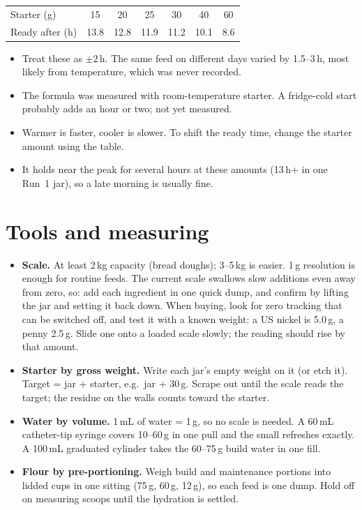 \documentclass[11pt]{article}
\newcommand{\plS}{30}\newcommand{\plF}{75}\newcommand{\plW}{75}
\begin{document}
\begin{center}
\begin{tabular}{@{}lcccccc@{}}
\toprule
Starter (g)        & 15 & 20 & 25 & 30 & 40 & 60 \\
Ready after (h)    & 13.8 & 12.8 & 11.9 & 11.2 & 10.1 & 8.6 \\
\bottomrule
\end{tabular}
\end{center}

\begin{itemize}
  \item Treat these as $\pm 2$\,h. The same feed on different days varied by
        1.5--3\,h, most likely from temperature, which was never recorded.
  \item The formula was measured with room-temperature starter. A fridge-cold start
        probably adds an hour or two; not yet measured.
  \item Warmer is faster, cooler is slower. To shift the ready time, change the
        starter amount using the table.
  \item It holds near the peak for several hours at these amounts (13\,h+ in one
        Run~1 jar), so a late morning is usually fine.
\end{itemize}

\section*{Tools and measuring}

\begin{itemize}
  \item \textbf{Scale.} At least 2\,kg capacity (bread doughs); 3--5\,kg is easier.
        1\,g resolution is enough for routine feeds. The current scale swallows slow
        additions even away from zero, so: add each ingredient in one quick dump,
        and confirm by lifting the jar and setting it back down. When buying, look
        for zero tracking that can be switched off, and test it with a known weight:
        a US nickel is 5.0\,g, a penny 2.5\,g. Slide one onto a loaded scale slowly;
        the reading should rise by that amount.
  \item \textbf{Starter by gross weight.} Write each jar's empty weight on it (or etch
        it). Target = jar + starter, e.g.\ jar + \plS\,g. Scrape out until the scale
        reads the target; the residue on the walls counts toward the starter.
  \item \textbf{Water by volume.} 1\,mL of water = 1\,g, so no scale is needed.
        A 60\,mL catheter-tip syringe covers 10--60\,g in one pull and the small
        refreshes exactly. A 100\,mL graduated cylinder takes the 60--75\,g build
        water in one fill.
  \item \textbf{Flour by pre-portioning.} Weigh build and maintenance portions into
        lidded cups in one sitting (75\,g, 60\,g, 12\,g), so each feed is one dump.
        Hold off on measuring scoops until the hydration is settled.
\end{itemize}
\end{document}
